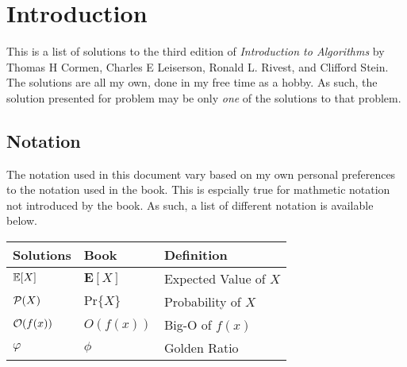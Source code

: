 \documentclass[../Algorithms]{subfiles}
\begin{document}
	\chapter*{Introduction}

	This is a list of solutions to the third edition of \textit{Introduction to Algorithms} by Thomas H Cormen, Charles E Leiserson, Ronald L. Rivest, and Clifford Stein. The solutions are all my own, done in my free time as a hobby. As such, the solution presented for problem may be only \textit{one} of the solutions to that problem.

	\section*{Notation}

	The notation used in this document vary based on my own personal preferences to the notation used in the book. This is espcially true for mathmetic notation not introduced by the book. As such, a list of different notation is available below.
	
	\begin{table}[ht]
		\begin{tabular}{l | l | l}
			\textbf{Solutions} & \textbf{Book} & \textbf{Definition}\\
			\hline
			$\mathbb{E}[X]$  & $\mathbf{E}[X]$    & Expected Value of $X$\\
			$\mathcal{P}(X)$    & $\mathrm{Pr}\{X\}$ & Probability of $X$\\
			$\mathcal{O}(f(x))$ & $O(f(x))$          & Big-O of $f(x)$\\
			$\varphi$     & $\phi$             & Golden Ratio
		\end{tabular}
	\end{table}
	
\end{document}
